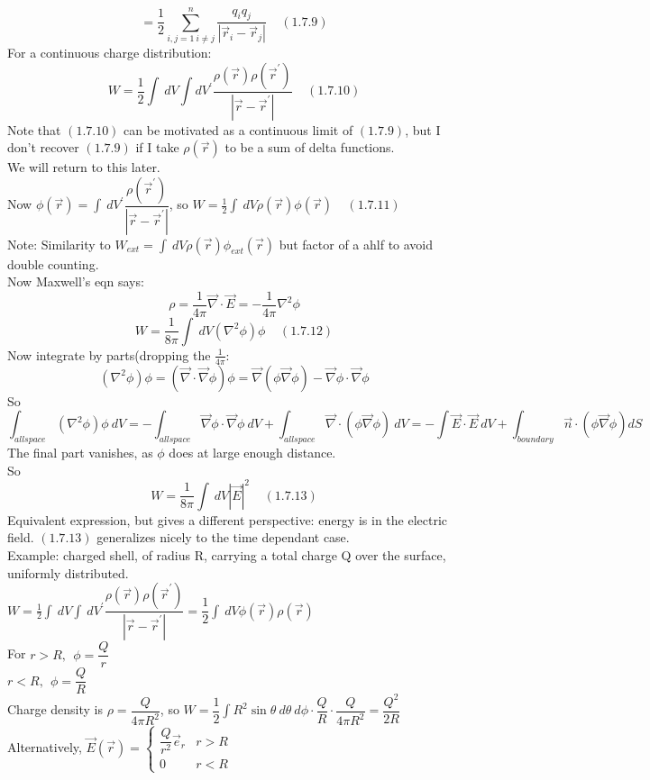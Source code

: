 \documentclass[a4paper,11pt]{article}
\newcommand{\Nab}{\vec{\nabla}}
\newcommand{\dop}[2]{\vec{#1}\cdot\vec{#2}}
\begin{document}
$$=\dfrac{1}{2}\sum^n _{i,j=1~i\neq j} \dfrac{q_iq_j}{|\vec{r}_i-\vec{r}_j|}~~~~~(1.7.9)$$
For a continuous charge distribution:
$$W=\dfrac{1}{2}\int ~dV \int dV^\prime \dfrac{\rho(\vec{r})\rho(\vec{r}^\prime)}{|\vec{r}-\vec{r}^\prime|}~~~~~(1.7.10)$$
Note that $(1.7.10)$ can be motivated as a continuous limit of $(1.7.9)$, but I don't recover $(1.7.9)$ if I take $\rho(\vec{r})$ to be a sum of delta functions.\\
We will return to this later.\\
Now $\phi(\vec{r})=\int~dV^\prime \dfrac{\rho(\vec{r}^\prime)}{|\vec{r}-\vec{r}^\prime|}$, so $W=\frac{1}{2}\int~dV \rho(\vec{r})\phi(\vec{r})~~~~~(1.7.11)$\\
Note: Similarity to $W_{ext}=\int~dV \rho(\vec{r})\phi_{ext}(\vec{r})$ but factor of a ahlf to avoid double counting.\\
Now Maxwell's eqn says:
$$\rho=\dfrac{1}{4\pi}\dop{\nabla}{E}=-\dfrac{1}{4\pi}\nabla^2 \phi$$
$$W=\dfrac{1}{8\pi}\int~dV(\nabla^2\phi)\phi~~~~~(1.7.12)$$
Now integrate by parts(dropping the $\frac{1}{4\pi}$:\\
$$(\nabla^2\phi)\phi=(\Nab\cdot\Nab\phi)\phi=\Nab(\phi\Nab\phi)-\Nab\phi\cdot\Nab\phi$$
So
$$\int_{allspace}(\nabla^2\phi)\phi~dV=-\int_{allspace}\Nab\phi\cdot\Nab\phi~dV+\int_{allspace}\Nab\cdot(\phi\Nab\phi)~dV=-\int \dop{E}{E}~dV+\int_{boundary}\vec{n}\cdot(\phi\Nab\phi)dS$$
The final part vanishes, as $\phi$ does at large enough distance.\\
So 
$$W=\frac{1}{8\pi}\int~dV|\vec{E}|^2~~~~~(1.7.13)$$
Equivalent expression, but gives a different perspective: energy is in the electric field. $(1.7.13)$ generalizes nicely to the time dependant case.\\
Example: charged shell, of radius R, carrying a total charge Q over the surface, uniformly distributed.\\
$W=\frac{1}{2}\int~dV \int~dV^\prime \dfrac{\rho(\vec{r})\rho(\vec{r}^\prime)}{|\vec{r}-\vec{r}^\prime|}=\dfrac{1}{2}\int~dV\phi(\vec{r})\rho(\vec{r})$\\
For $r>R,~~\phi=\dfrac{Q}{r}$\\
$r<R,~~\phi=\dfrac{Q}{R}$\\
Charge density is $\rho=\dfrac{Q}{4\pi R^2}$, so $W=\dfrac{1}{2}\int R^2 \sin\theta ~d\theta~d\phi \cdot \dfrac{Q}{R}\cdot \dfrac{Q}{4\pi R^2}=\dfrac{Q^2}{2R}$\\
Alternatively, $\vec{E}(\vec{r})=\left\{\begin{array}{cc}\dfrac{Q}{r^2}\vec{e}_r&r>R\\0&r<R\end{array}\right.$\\
\end{document}
